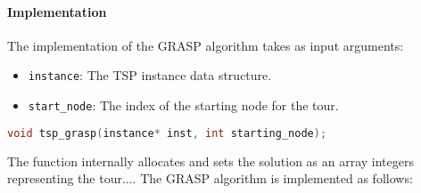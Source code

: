 \documentclass{article}
\begin{document}
\paragraph{Implementation}
The implementation of the GRASP algorithm takes as input arguments:
\begin{itemize}
	\item \texttt{instance}: The TSP instance data structure.
	\item \texttt{start\_node}: The index of the starting node for the tour.
\end{itemize}
\begin{lstlisting}[language=C]
	void tsp_grasp(instance* inst, int starting_node);
\end{lstlisting}
The function internally allocates and sets the solution as an array integers representing the tour....
The GRASP algorithm is implemented as follows:
\end{document}
